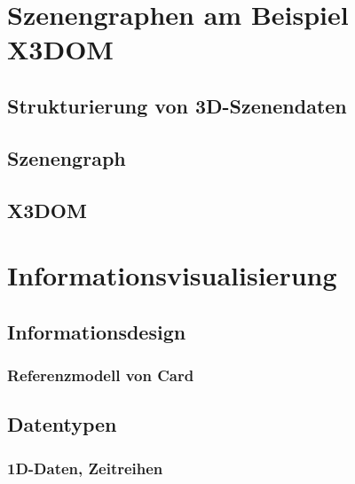 \documentclass[a4paper, 11pt, accentcolor = tud3b]{tudreport}
\begin{document}
	\chapter{Szenengraphen am Beispiel X3DOM} %

		\section{Strukturierung von 3D-Szenendaten} %

		\section{Szenengraph} %

		\section{X3DOM} %

	\chapter{Informationsvisualisierung} %

		\section{Informationsdesign} %

			\subsection{Referenzmodell von Card} %

		\section{Datentypen} %

			\subsection{1D-Daten, Zeitreihen} %
\end{document}
